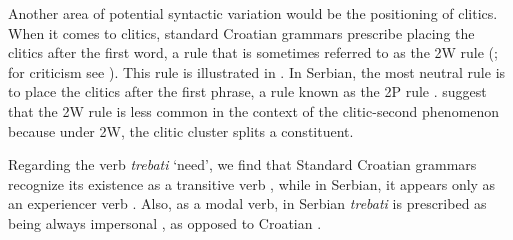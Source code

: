 \documentclass[output=paper,
modfonts,
newtxmath,
hidelinks,
]{langscibook}
\begin{document}
\ea \label{ex1}
	\z
\z

\noindent Another area of potential syntactic variation would be the positioning of clitics. When it comes to clitics, standard Croatian grammars prescribe placing the clitics after the first word, a rule that is sometimes referred to as the 2W rule (\citealt{Katicic}; for criticism see \citealt{Peti-Stantic2009}). This rule is illustrated in . In Serbian, the most neutral rule is to place the clitics after the first phrase, a rule known as the 2P rule . \citet{CorbettBrowne2009} suggest that the 2W rule is less common in the context of the clitic-second phenomenon because under 2W, the clitic cluster splits a constituent. 

\ea \label{ex2}
	\z
\z

\noindent Regarding the verb \textit{trebati} `need’, we find that Standard Croatian grammars recognize its existence as a transitive verb , while in Serbian, it appears only as an experiencer verb . Also, as a modal verb, in Serbian \textit{trebati} is prescribed as being always impersonal , as opposed to Croatian .

\ea \label{ex3}
	\z
\z
\end{document}
